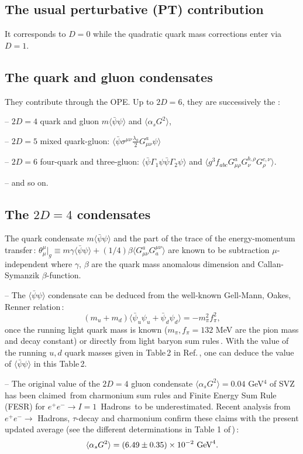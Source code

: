 \documentclass[aps,prd,groupedaddress,nofootinbib]{revtex4-1}
\def\beq{\begin{equation}}
\def\eeq{\end{equation}}
\def\la{\langle}
\def\ra{\rangle}
\begin{document}
\subsection{The usual perturbative (PT) contribution}
It corresponds to $D=0$ while the quadratic quark mass corrections enter via $D=1$. 
\subsection{The quark and gluon condensates}
They  contribute through the  OPE. Up to $2D=6$, they are successively the :

-- $2D=4$ quark and gluon $ m\la\bar\psi\psi\ra$ and $ \la \alpha_s G^2\ra$, 

-- $2D=5$ mixed quark-gluon: $\la\bar\psi\sigma^{\mu\nu}\frac{\lambda_a}{2}G_{\mu\nu}^a\psi\ra$

-- $2D=6$ four-quark and three-gluon:  $\la\bar\psi  \Gamma_1\psi \bar\psi \Gamma_2\psi\ra$ and  $ \la g^3f_{abc} G^a_{\mu\rho}G^{b,\rho}_{\nu}G^{c,\nu}_\rho\ra$. 

-- and so on. 
\subsection{The $2D=4$ condensates}
The quark condensate $m\la\bar\psi\psi\ra$ and the part of the trace of the energy-momentum transfer\,: $\theta^\mu_\mu\vert_g\equiv m\gamma \la\bar\psi\psi\ra +(1/4)\beta \la  G^a_{\mu\nu}G_a^{\mu\nu}\ra$ are known to be subtraction $\mu$-independent where $\gamma,\, \beta$ are the quark mass anomalous dimension and Callan-Symanzik $\beta$-function.  

-- The $\la\bar\psi\psi\ra$ condensate can be deduced from the well-known Gell-Mann, Oakes, Renner relation\,\cite{GMOR}:
\vspace*{-0.15cm}
\beq
(m_u+m_d)\la\bar\psi_u\psi_u+\bar\psi_d\psi_d\ra  = -m_\pi^2f_\pi^2,
\eeq
\vspace*{-0.15cm}
once the running light quark mass is known ($m_\pi, f_\pi =132$ MeV are the pion mass and decay constant) or directly from light baryon sum rules\,\cite{DOSCHSN}. With the value of the running $u,d$ quark masses given in Table\,2 in Ref.\,\cite{SNREV22}, one can deduce the value of  $\la\bar\psi\psi\ra$ in this Table\,2. 

-- The original value of the $2D=4$ gluon condensate $\la \alpha_s G^2\ra=0.04$ GeV$^4$ of SVZ\,\cite{SVZa,RRY} has been claimed\,\cite{BELLa,BERTa} from charmonium sum rules and  Finite Energy Sum Rule (FESR) for $e^+e^-\to I=1$\, Hadrons\,\cite{FESR1,FESR2} to be underestimated. Recent analysis from $e^+e^-\to$   Hadrons, $\tau$-decay and charmonium confirm these claims with the  present updated  average
(see the different determinations in Table 1 of\,\cite{SNparam})\,:
\vspace*{-0.15cm}
\beq
\la \alpha_s G^2\ra=(6.49\pm 0.35)\times 10^{-2}~{\rm GeV}^4. 
\label{eq:g2}
\eeq
\vspace*{-0.15cm}
\end{document}
